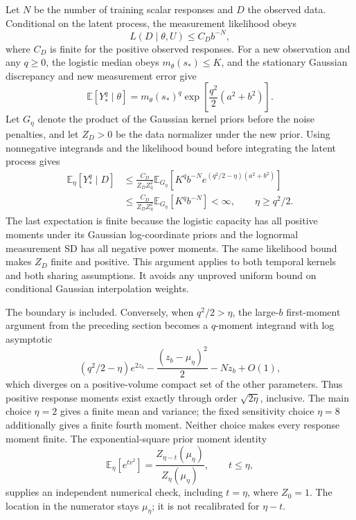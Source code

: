     Let \(N\) be the number of training scalar responses and \(D\) the
    observed data. Conditional on the latent process, the measurement
    likelihood obeys
    \[
        L(D\mid\theta,U)\le C_D b^{-N},
    \]
    where \(C_D\) is finite for the positive observed responses. For a new
    observation and any \(q\ge0\), the logistic median obeys
    \(m_\theta(s_*)\le K\), and the stationary Gaussian discrepancy and new
    measurement error give
    \[
        \mathbb E[Y_*^q\mid\theta]
        =m_\theta(s_*)^q
            \exp\!\left[\frac{q^2}{2}(a^2+b^2)\right].
    \]
    Let \(G_\eta\) denote the product of the Gaussian kernel priors before
    the noise penalties, and let \(Z_D>0\) be the data normalizer under the
    new prior. Using nonnegative integrands and the likelihood bound before
    integrating the latent process gives
    \begin{align*}
        \mathbb E_\eta[Y_*^q\mid D]
        &\le\frac{C_D}{Z_D Z_\eta^2}
            \mathbb E_{G_\eta}\!\left[
                K^q b^{-N}
                e^{(q^2/2-\eta)(a^2+b^2)}
            \right]\\
        &\le\frac{C_D}{Z_D Z_\eta^2}
            \mathbb E_{G_\eta}[K^q b^{-N}]<\infty,
            \qquad \eta\ge q^2/2.
    \end{align*}
    The last expectation is finite because the logistic capacity has all
    positive moments under its Gaussian log-coordinate priors and the
    lognormal measurement SD has all negative power moments. The same
    likelihood bound makes \(Z_D\) finite and positive. This argument applies
    to both temporal kernels and both sharing assumptions. It avoids any
    unproved uniform bound on conditional Gaussian interpolation weights.

    The boundary is included. Conversely, when \(q^2/2>\eta\), the
    large-\(b\) first-moment argument from the preceding section becomes
    a \(q\)-moment integrand with log asymptotic
    \[
        (q^2/2-\eta)e^{2z_b}
        -\frac{(z_b-\mu_\eta)^2}{2}-Nz_b+O(1),
    \]
    which diverges on a positive-volume compact set of the other parameters.
    Thus positive response moments exist exactly through order
    \(\sqrt{2\eta}\), inclusive. The main choice \(\eta=2\) gives a finite
    mean and variance; the fixed sensitivity choice \(\eta=8\) additionally
    gives a finite fourth moment. Neither choice makes every response moment
    finite. The exponential-square prior moment identity
    \[
        \mathbb E_\eta[e^{t v^2}]
        =\frac{Z_{\eta-t}(\mu_\eta)}{Z_\eta(\mu_\eta)},
        \qquad t\le\eta,
    \]
    supplies an independent numerical check, including \(t=\eta\), where
    \(Z_0=1\). The location in the numerator stays \(\mu_\eta\); it is not
    recalibrated for \(\eta-t\).

